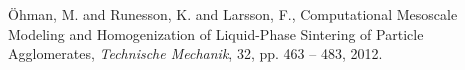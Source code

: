 \documentclass[notitlepage,a4paper,fleqn,9pt]{extarticle}
\begin{document}
\begin{multicols}{2}
% 
% 
% 

\begin{thebibliography}{99}

   Öhman, M. and Runesson, K. and Larsson, F.,
   Computational Mesoscale Modeling and Homogenization of Liquid-Phase Sintering of Particle Agglomerates,
   \emph{Technische Mechanik},
   32, pp. 463 -- 483, 2012.


% 
% 

\end{thebibliography}


\end{multicols}
\end{document}
